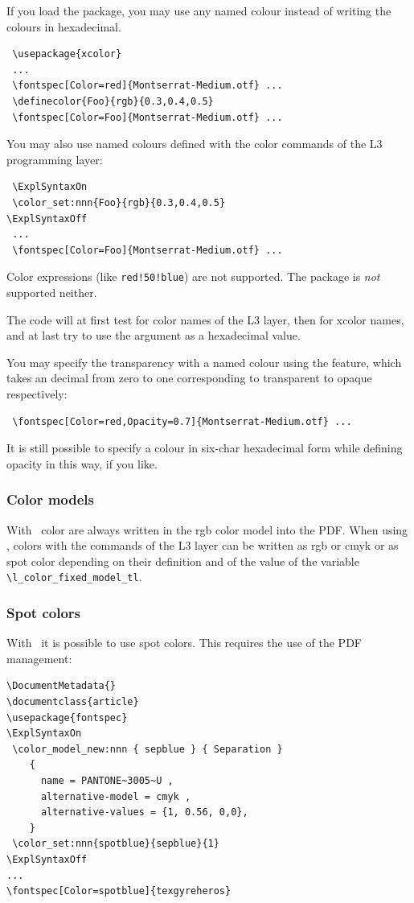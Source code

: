 \documentclass[a4paper]{l3doc}
\begin{document}
If you load the  package, you may use any named colour instead
of writing the colours in hexadecimal.
\begin{Verbatim}
 \usepackage{xcolor}
 ...
 \fontspec[Color=red]{Montserrat-Medium.otf} ...
 \definecolor{Foo}{rgb}{0.3,0.4,0.5}
 \fontspec[Color=Foo]{Montserrat-Medium.otf} ...
\end{Verbatim}

You may also use named colours defined with the color commands of the L3 
programming layer:
\begin{Verbatim}
 \ExplSyntaxOn
 \color_set:nnn{Foo}{rgb}{0.3,0.4,0.5}
\ExplSyntaxOff
 ...
 \fontspec[Color=Foo]{Montserrat-Medium.otf} ...
\end{Verbatim}

Color expressions (like \verb+red!50!blue+) are not supported. The  
package is \emph{not} supported neither. 

The code will at first test for color names of the L3 layer, then for xcolor 
names, and at last try to use the argument as a hexadecimal value.

You may specify the transparency with a named colour using the  
feature, which takes an decimal from zero to one corresponding to transparent 
to opaque respectively: 
\begin{Verbatim}
 \fontspec[Color=red,Opacity=0.7]{Montserrat-Medium.otf} ...
\end{Verbatim}
It is still possible to specify a colour in six-char hexadecimal form
while defining opacity in this way, if you like.

\subsubsection{Color models}

With \XeTeX\ color are always written in the rgb color model into the PDF. 
When using \LuaTeX, colors with the commands of the L3 layer can be written 
as rgb or cmyk or as spot color depending on their definition and of the 
value of the variable \verb+\l_color_fixed_model_tl+. 
 
\subsubsection{Spot colors} 
With \LuaTeX\ it is possible to use spot colors. This requires the use of the 
PDF management:
\begin{Verbatim}
\DocumentMetadata{}
\documentclass{article}
\usepackage{fontspec}
\ExplSyntaxOn
 \color_model_new:nnn { sepblue } { Separation }
    {
      name = PANTONE~3005~U ,
      alternative-model = cmyk ,
      alternative-values = {1, 0.56, 0,0},
    }
 \color_set:nnn{spotblue}{sepblue}{1}
\ExplSyntaxOff
...
\fontspec[Color=spotblue]{texgyreheros}
\end{Verbatim}
\end{document}
